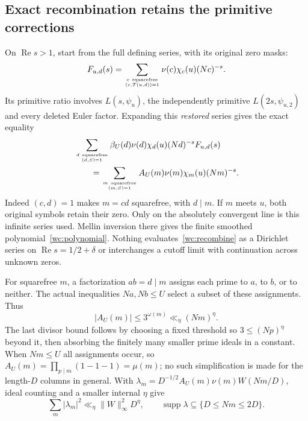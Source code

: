 \documentclass[11pt,oneside,openany]{book}
\theoremstyle{definition}\newtheorem{definition}[theorem]{Definition}
\theoremstyle{remark}\newtheorem{remark}[theorem]{Remark}
\begin{document}
\subsection{Exact recombination retains the primitive corrections}
On $\operatorname{Re}s>1$, start from the full defining series, with
its original zero masks:
\[
 F_{u,d}(s)=\sum_{c\ \mathrm{squarefree}\atop(c,T(u,d))=1}
                 \nu(c)\chi_c(u)(Nc)^{-s}.
\]
Its primitive ratio involves $L(s,\psi_u)$, the independently primitive
$L(2s,\psi_{u,2})$ and every deleted Euler factor. Expanding this
\emph{restored} series gives the exact equality
\begin{align}\label{wc:recombine}
 &\sum_{d\ \mathrm{squarefree}\atop(d,S)=1}
 \beta_U(d)\nu(d)\chi_d(u)(Nd)^{-s}F_{u,d}(s)\notag\\
 &\qquad=\sum_{m\ \mathrm{squarefree}\atop(m,S)=1}
               A_U(m)\nu(m)\chi_m(u)(Nm)^{-s}.
\end{align}
Indeed $(c,d)=1$ makes $m=cd$ squarefree, with $d\mid m$. If $m$
meets $u$, both original symbols retain their zero. Only on the
absolutely convergent line is this infinite series used. Mellin inversion
there gives the finite smoothed polynomial~\eqref{wc:polynomial}.
Nothing evaluates~\eqref{wc:recombine} as a Dirichlet series on
$\operatorname{Re}s=1/2+\delta$ or interchanges a cutoff limit with
continuation across unknown zeros.

For squarefree $m$, a factorization $ab=d\mid m$ assigns each prime
to $a$, to $b$, or to neither. The actual inequalities $Na,Nb\le U$
select a subset of these assignments. Thus
\[
 |A_U(m)|\le3^{\omega(m)}\ll_\eta(Nm)^\eta.
\]
The last divisor bound follows by choosing a fixed threshold so
$3\le(Np)^\eta$ beyond it, then absorbing the finitely many smaller
prime ideals in a constant. When $Nm\le U$ all assignments occur,
so $A_U(m)=\prod_{p\mid m}(1-1-1)=\mu(m)$; no such simplification
is made for the length-$D$ columns in general. With
$\lambda_m=D^{-1/2}A_U(m)\nu(m)W(Nm/D)$, ideal counting and a
smaller internal $\eta$ give
\begin{equation}\label{wc:l2}
 \sum_m|\lambda_m|^2\ll_\eta\|W\|_\infty^2D^\eta,
 \qquad \operatorname{supp}\lambda\subseteq\{D\le Nm\le2D\}.
\end{equation}
\end{document}
